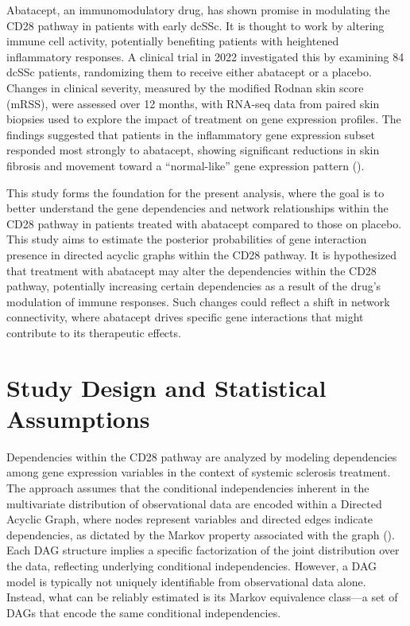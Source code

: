 \documentclass{report}
\begin{document}
Abatacept, an immunomodulatory drug, has shown promise in modulating the CD28 pathway in patients with early dcSSc. It is thought to work by altering immune cell activity, potentially benefiting patients with heightened inflammatory responses. A clinical trial in 2022 investigated this by examining 84 dcSSc patients, randomizing them to receive either abatacept or a placebo. Changes in clinical severity, measured by the modified Rodnan skin score (mRSS), were assessed over 12 months, with RNA-seq data from paired skin biopsies used to explore the impact of treatment on gene expression profiles. The findings suggested that patients in the inflammatory gene expression subset responded most strongly to abatacept, showing significant reductions in skin fibrosis and movement toward a “normal-like” gene expression pattern (\citet{mehta2022machine}).

This study forms the foundation for the present analysis, where the goal is to better understand the gene dependencies and network relationships within the CD28 pathway in patients treated with abatacept compared to those on placebo. This study aims to estimate the posterior probabilities of gene interaction presence in directed acyclic graphs within the CD28 pathway.
It is hypothesized that treatment with abatacept may alter the dependencies within the CD28 pathway, potentially increasing certain dependencies as a result of the drug’s modulation of immune responses. Such changes could reflect a shift in network connectivity, where abatacept drives specific gene interactions that might contribute to its therapeutic effects.

\section{Study Design and Statistical Assumptions}

Dependencies within the CD28 pathway are analyzed by modeling dependencies among gene expression variables in the context of systemic sclerosis treatment. The approach assumes that the conditional independencies inherent in the multivariate distribution of observational data are encoded within a Directed Acyclic Graph, where nodes represent variables and directed edges indicate dependencies, as dictated by the Markov property associated with the graph (\citet{friedman2004inferring}). Each DAG structure implies a specific factorization of the joint distribution over the data, reflecting underlying conditional independencies. However, a DAG model is typically not uniquely identifiable from observational data alone. Instead, what can be reliably estimated is its Markov equivalence class—a set of DAGs that encode the same conditional independencies. 
\end{document}
